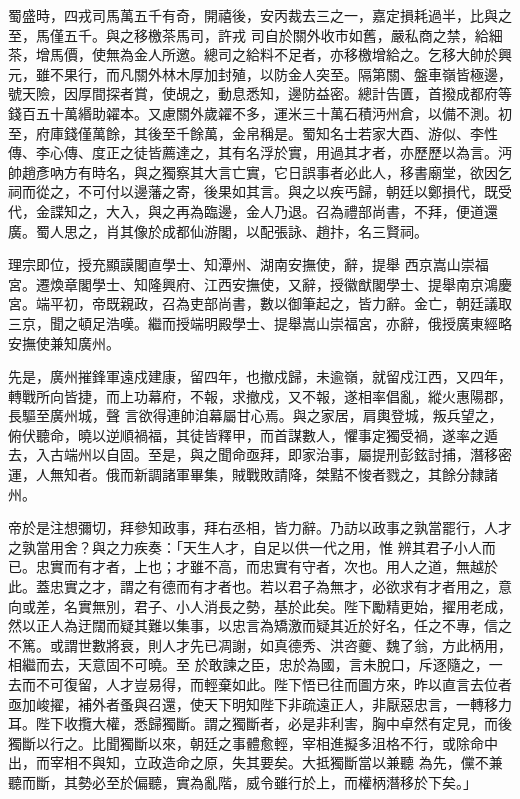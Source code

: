 \begin{pinyinscope}
 蜀盛時，四戎司馬萬五千有奇，開禧後，安丙裁去三之一，嘉定損耗過半，比與之至，馬僅五千。與之移檄茶馬司，許戎
 司自於關外收市如舊，嚴私商之禁，給細茶，增馬價，使無為金人所邀。總司之給料不足者，亦移檄增給之。乞移大帥於興元，雖不果行，而凡關外林木厚加封殖，以防金人突至。隔第關、盤車嶺皆極邊，號天險，因厚間探者賞，使覘之，動息悉知，邊防益密。總計告匱，首撥成都府等錢百五十萬緡助糴本。又慮關外歲糴不多，運米三十萬石積沔州倉，以備不測。初至，府庫錢僅萬餘，其後至千餘萬，金帛稱是。蜀知名士若家大酉、游似、李性
 傳、李心傳、度正之徒皆薦達之，其有名浮於實，用過其才者，亦歷歷以為言。沔帥趙彥吶方有時名，與之獨察其大言亡實，它日誤事者必此人，移書廟堂，欲因乞祠而從之，不可付以邊藩之寄，後果如其言。與之以疾丐歸，朝廷以鄭損代，既受代，金諜知之，大入，與之再為臨邊，金人乃退。召為禮部尚書，不拜，便道還廣。蜀人思之，肖其像於成都仙游閣，以配張詠、趙抃，名三賢祠。



 理宗即位，授充顯謨閣直學士、知潭州、湖南安撫使，辭，提舉
 西京嵩山崇福宮。遷煥章閣學士、知隆興府、江西安撫使，又辭，授徽猷閣學士、提舉南京鴻慶宮。端平初，帝既親政，召為吏部尚書，數以御筆起之，皆力辭。金亡，朝廷議取三京，聞之頓足浩嘆。繼而授端明殿學士、提舉嵩山崇福宮，亦辭，俄授廣東經略安撫使兼知廣州。



 先是，廣州摧鋒軍遠戍建康，留四年，也撤戍歸，未逾嶺，就留戍江西，又四年，轉戰所向皆捷，而上功幕府，不報，求撤戍，又不報，遂相率倡亂，縱火惠陽郡，長驅至廣州城，聲
 言欲得連帥洎幕屬甘心焉。與之家居，肩輿登城，叛兵望之，俯伏聽命，曉以逆順禍福，其徒皆釋甲，而首謀數人，懼事定獨受禍，遂率之遁去，入古端州以自固。至是，與之聞命亟拜，即家治事，屬提刑彭鉉討捕，潛移密運，人無知者。俄而新調諸軍畢集，賊戰敗請降，桀黠不悛者戮之，其餘分隸諸州。



 帝於是注想彌切，拜參知政事，拜右丞相，皆力辭。乃訪以政事之孰當罷行，人才之孰當用舍？與之力疾奏：「天生人才，自足以供一代之用，惟
 辨其君子小人而已。忠實而有才者，上也；才雖不高，而忠實有守者，次也。用人之道，無越於此。蓋忠實之才，謂之有德而有才者也。若以君子為無才，必欲求有才者用之，意向或差，名實無別，君子、小人消長之勢，基於此矣。陛下勵精更始，擢用老成，然以正人為迂闊而疑其難以集事，以忠言為矯激而疑其近於好名，任之不專，信之不篤。或謂世數將衰，則人才先已凋謝，如真德秀、洪咨夔、魏了翁，方此柄用，相繼而去，天意固不可曉。至
 於敢諫之臣，忠於為國，言未脫口，斥逐隨之，一去而不可復留，人才豈易得，而輕棄如此。陛下悟已往而圖方來，昨以直言去位者亟加峻擢，補外者蚤與召還，使天下明知陛下非疏遠正人，非厭惡忠言，一轉移力耳。陛下收攬大權，悉歸獨斷。謂之獨斷者，必是非利害，胸中卓然有定見，而後獨斷以行之。比聞獨斷以來，朝廷之事體愈輕，宰相進擬多沮格不行，或除命中出，而宰相不與知，立政造命之原，失其要矣。大抵獨斷當以兼聽
 為先，儻不兼聽而斷，其勢必至於偏聽，實為亂階，威令雖行於上，而權柄潛移於下矣。」




\end{pinyinscope}
